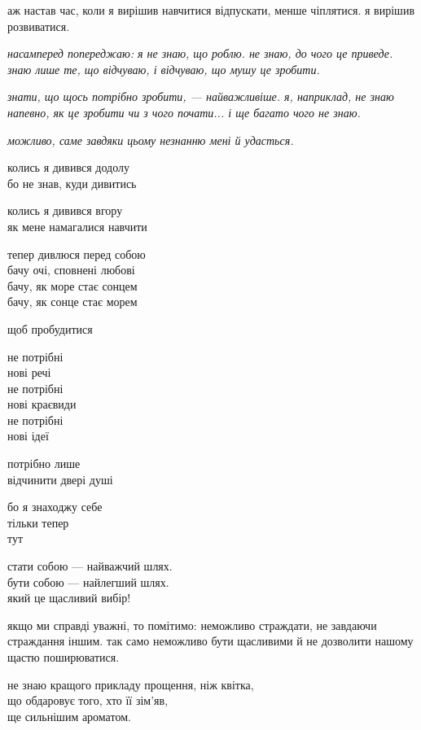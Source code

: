 \documentclass[oneside,12pt]{book}
\begin{document}
аж настав час, коли я вирішив навчитися відпускати, менше чіплятися. я вирішив розвиватися.

\begin{flushright}
\emph{насамперед попереджаю: я не знаю, що роблю. не знаю, до чого це приведе. знаю лише те, що відчуваю, і відчуваю, що мушу це зробити.}

\emph{знати, що щось потрібно зробити, --- найважливіше. я, наприклад, не знаю напевно, як це зробити чи з чого почати... і ще багато чого не знаю.}

\emph{можливо, саме завдяки цьому незнанню мені й удасться.}
\end{flushright}

\newpage
колись я дивився додолу\\
бо не знав, куди дивитись

колись я дивився вгору\\
як мене намагалися навчити

тепер дивлюся перед собою\\
бачу очі, сповнені любові\\
бачу, як море стає сонцем\\
бачу, як сонце стає морем

\begin{flushright}
щоб пробудитися

не потрібні\\
нові речі\\
не потрібні\\
нові краєвиди\\
не потрібні\\
нові ідеї

потрібно лише\\
відчинити двері душі

бо я знаходжу себе\\
тільки тепер\\
тут
\end{flushright}

\newpage
стати собою --- найважчий шлях.\\
бути собою --- найлегший шлях.\\
який це щасливий вибір!

\begin{flushright}
якщо ми справді уважні, то помітимо: неможливо страждати, не завдаючи страждання іншим. так само неможливо бути щасливими й не дозволити нашому щастю поширюватися.
\end{flushright}

не знаю кращого прикладу прощення, ніж квітка,\\
що обдаровує того, хто її зім'яв,\\
ще сильнішим ароматом.
\end{document}

